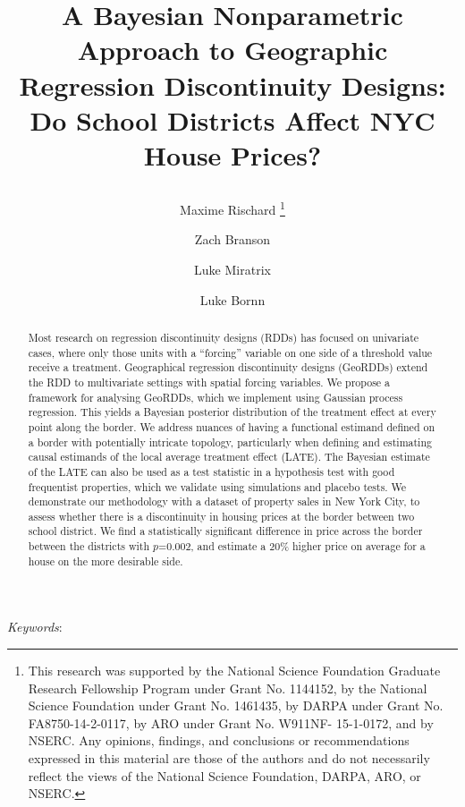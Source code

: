 \documentclass[12pt]{article}
\newcommand{\georddtitle}{
    A Bayesian Nonparametric Approach to Geographic Regression Discontinuity Designs:
    Do School Districts Affect NYC House Prices?
}
\begin{document}
\singlespacing


\title{
    \LARGE
    \bf
    \georddtitle
}
\author[a]{Maxime Rischard
	\thanks{
		This research was supported by the National Science Foundation Graduate Research Fellowship Program under Grant No. 1144152, by the National Science Foundation under Grant No. 1461435, by DARPA under Grant No. FA8750-14-2-0117, by ARO under Grant No. W911NF- 15-1-0172, and by NSERC. Any opinions, findings, and conclusions or recommendations expressed in this material are those of the authors and do not necessarily reflect the views of the National Science Foundation, DARPA, ARO, or NSERC.
	}
}
\author[a]{Zach Branson}
\author[b]{Luke Miratrix}
\author[c]{Luke Bornn}
\maketitle

\begin{abstract}
    Most research on regression discontinuity designs (RDDs) has focused on univariate cases, where only those units with a ``forcing'' variable on one side of a threshold value receive a treatment.
    Geographical regression discontinuity designs (GeoRDDs) extend the RDD to multivariate settings with spatial forcing variables.
    We propose a framework for analysing GeoRDDs, which we implement using Gaussian process regression. 
    This yields a Bayesian posterior distribution of the treatment effect at every point along the border.
    We address nuances of having a functional estimand defined on a border with potentially intricate topology, particularly when defining and estimating causal estimands of the local average treatment effect (LATE).
    The Bayesian estimate of the LATE can also be used as a test statistic
    in a hypothesis test with good frequentist properties, 
    which we validate using simulations and placebo tests.
    We demonstrate our methodology with a dataset of property sales in New York City,
    to assess whether there is a discontinuity in housing prices at the border between two school district.
    We find a statistically significant difference in price across the border between the districts with \(p\)=0.002, and estimate a 20\%  higher price on average for a house on the more desirable side.
\end{abstract}

\noindent%
{\it Keywords}: \georddkeywords
\vfill
\newpage
\end{document}
